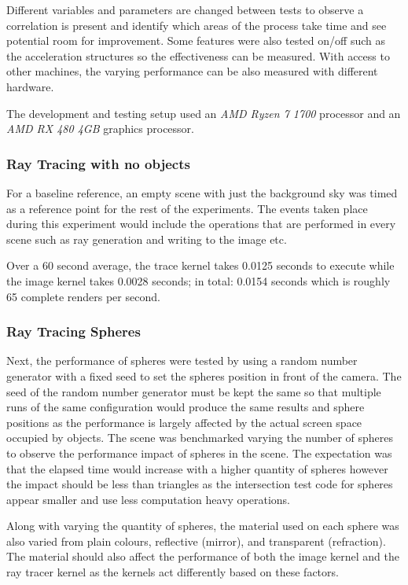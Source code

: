 \documentclass[final]{cmpreport}
\begin{document}
Different variables and parameters are changed between tests to observe a correlation is present and identify which areas of the process take time and see potential room for improvement. Some features were also tested on/off such as the acceleration structures so the effectiveness can be measured. With access to other machines, the varying performance can be also measured with different hardware.

The development and testing setup used an \textit{AMD Ryzen 7 1700} processor and an \textit{AMD RX 480 4GB} graphics processor.

\subsubsection{Ray Tracing with no objects}

For a baseline reference, an empty scene with just the background sky was timed as a reference point for the rest of the experiments. The events taken place during this experiment would include the operations that are performed in every scene such as ray generation and writing to the image etc.

Over a 60 second average, the trace kernel takes 0.0125 seconds to execute while the image kernel takes 0.0028 seconds; in total: 0.0154 seconds which is roughly 65 complete renders per second.

\subsubsection{Ray Tracing Spheres}

Next, the performance of spheres were tested by using a random number generator with a fixed seed to set the spheres position in front of the camera. The seed of the random number generator must be kept the same so that multiple runs of the same configuration would produce the same results and sphere positions as the performance is largely affected by the actual screen space occupied by objects. The scene was benchmarked varying the number of spheres to observe the performance impact of spheres in the scene. The expectation was that the elapsed time would increase with a higher quantity of spheres however the impact should be less than triangles as the intersection test code for spheres appear smaller and use less computation heavy operations.

Along with varying the quantity of spheres, the material used on each sphere was also varied from plain colours, reflective (mirror), and transparent (refraction). The material should also affect the performance of both the image kernel and the ray tracer kernel as the kernels act differently based on these factors.
\end{document}
